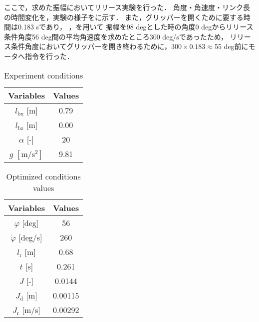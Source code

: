           ここで，求めた振幅においてリリース実験を行った．
          角度・角速度・リンク長の時間変化を\figref{}，実験の様子を\figref{}に示す．
          また，グリッパーを開くために要する時間は0.183 sであり，
          ，を用いて
          振幅を98 degとした時の角度0 degからリリース条件角度56 deg間の平均角速度を求めたところ300 deg/sであったため，
          リリース条件角度においてグリッパーを開き終わるために，$300\times0.183\approx$55 deg前にモータへ指令を行った．
          \begin{table}[tb]
            \begin{center}
              \caption{Experiment conditions}
              \vspace{2mm}
              \begin{tabular}{c|c}
                \hline
                Variables & Values \\
                \hline
                $l_{\mathrm{bx}}$ [m] & 0.79 \\
                $l_{\mathrm{bz}}$ [m] & 0.00 \\
                $\alpha$ [-]& 20 \\
                $g$ $\mathrm{[m/s^2]}$ & 9.81 \\
                \hline
              \end{tabular}
            \end{center}
          \end{table}
          \begin{table}[tb]
            \begin{center}
              \caption{Optimized conditions values}
              \vspace{2mm}
              \begin{tabular}{c|c}
                \hline
                Variables & Values \\
                \hline
                $\varphi$ [deg] & 56 \\
                $\dot{\varphi}$ [deg/s] & 260 \\
                $l_{\mathrm{r}}$ [m] & 0.68 \\
                $t$ [s] & 0.261 \\
                $J$ [-] & 0.0144 \\
                $J_{\mathrm{d}}$ [m] & 0.00115 \\
                $J_{\mathrm{r}}$ [m/s] & 0.00292 \\
                \hline
              \end{tabular}
            \end{center}
          \end{table}

